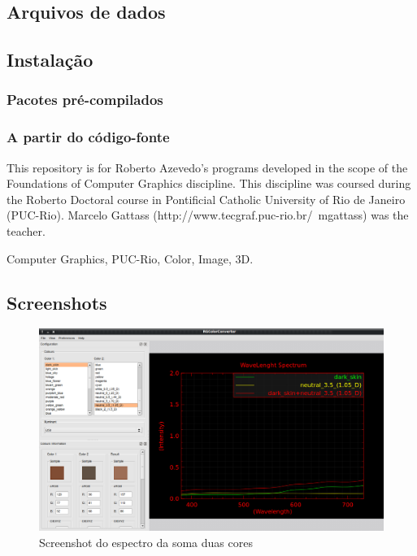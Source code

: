 \documentclass[a4paper,10pt]{report}
\begin{document}
\subsection{Arquivos de dados}

\subsection{Instalação}
\subsubsection{Pacotes pré-compilados}

\subsubsection{A partir do código-fonte}
This repository is for Roberto Azevedo's programs developed in the scope of the
Foundations of Computer Graphics discipline. This discipline was coursed during
the Roberto Doctoral course in Pontificial Catholic University of Rio de Janeiro
(PUC-Rio). Marcelo Gattass (http://www.tecgraf.puc-rio.br/~mgattass) was the
teacher.

Computer Graphics, PUC-Rio, Color, Image, 3D.

\subsection{Screenshots}

\begin{figure}[!htb]
     \centering
     \includegraphics[scale=0.7]{img/screenshot_RGColorConverter.png}
     \caption{Screenshot do espectro da soma duas cores}
     \label{fig:screenshot_01}
\end{figure}
\end{document}
